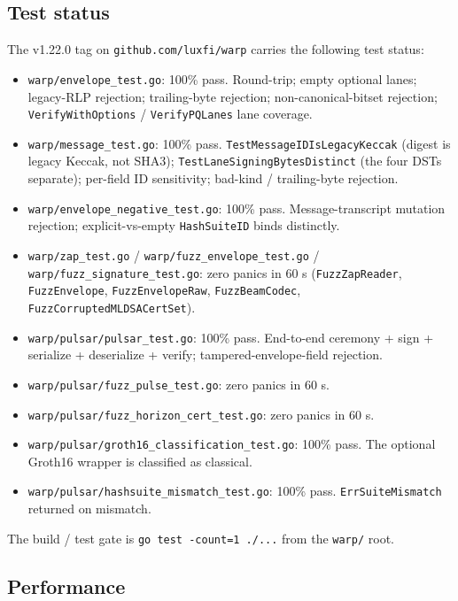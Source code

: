 \subsection{Test status}

The v1.22.0 tag on \texttt{github.com/luxfi/warp} carries the following test status:

\begin{itemize}[leftmargin=2em,nosep]
  \item \texttt{warp/envelope\_test.go}: 100\% pass. Round-trip; empty optional lanes; legacy-RLP rejection; trailing-byte rejection; non-canonical-bitset rejection; \texttt{VerifyWithOptions} / \texttt{VerifyPQLanes} lane coverage.
  \item \texttt{warp/message\_test.go}: 100\% pass. \texttt{TestMessageIDIsLegacyKeccak} (digest is legacy Keccak, not SHA3); \texttt{TestLaneSigningBytesDistinct} (the four DSTs separate); per-field ID sensitivity; bad-kind / trailing-byte rejection.
  \item \texttt{warp/envelope\_negative\_test.go}: 100\% pass. Message-transcript mutation rejection; explicit-vs-empty \texttt{HashSuiteID} binds distinctly.
  \item \texttt{warp/zap\_test.go} / \texttt{warp/fuzz\_envelope\_test.go} / \texttt{warp/fuzz\_signature\_test.go}: zero panics in 60 s (\texttt{FuzzZapReader}, \texttt{FuzzEnvelope}, \texttt{FuzzEnvelopeRaw}, \texttt{FuzzBeamCodec}, \texttt{FuzzCorruptedMLDSACertSet}).
  \item \texttt{warp/pulsar/pulsar\_test.go}: 100\% pass. End-to-end ceremony + sign + serialize + deserialize + verify; tampered-envelope-field rejection.
  \item \texttt{warp/pulsar/fuzz\_pulse\_test.go}: zero panics in 60 s.
  \item \texttt{warp/pulsar/fuzz\_horizon\_cert\_test.go}: zero panics in 60 s.
  \item \texttt{warp/pulsar/groth16\_classification\_test.go}: 100\% pass. The optional Groth16 wrapper is classified as classical.
  \item \texttt{warp/pulsar/hashsuite\_mismatch\_test.go}: 100\% pass. \texttt{ErrSuiteMismatch} returned on mismatch.
\end{itemize}

The build / test gate is \texttt{go test -count=1 ./...} from the \texttt{warp/} root.

\subsection{Performance}

